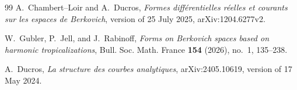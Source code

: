 \documentclass[11pt]{article}
\theoremstyle{remark}
\begin{document}





\begin{thebibliography}{99}
A.~Chambert--Loir and A.~Ducros,
\emph{Formes diff\'erentielles r\'eelles et courants sur les espaces de
Berkovich}, version of 25 July 2025, arXiv:1204.6277v2.

W.~Gubler, P.~Jell, and J.~Rabinoff,
\emph{Forms on Berkovich spaces based on harmonic tropicalizations},
Bull. Soc. Math. France \textbf{154} (2026), no.~1, 135--238.

A.~Ducros,
\emph{La structure des courbes analytiques},
arXiv:2405.10619, version of 17 May 2024.
\end{thebibliography}
\end{document}
